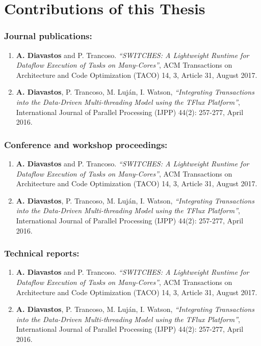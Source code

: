 \documentclass[a4paper,12pt,openright,oneside]{book}
\begin{document}
\chapter*{Contributions of this Thesis}

\singlespace
\subsection*{Journal publications:}

\begin{enumerate}
	\item \textbf{A. Diavastos} and P. Trancoso. \textit{“SWITCHES: A Lightweight Runtime for Dataflow Execution of Tasks on Many-Cores”}, ACM Transactions on Architecture and Code Optimization (TACO) 14, 3, Article 31, August 2017.

	\item \textbf{A. Diavastos}, P. Trancoso, M. Luj{\'a}n, I. Watson, \textit{“Integrating Transactions into the Data-Driven Multi-threading Model using the TFlux Platform”}, International Journal of Parallel Processing (IJPP) 44(2): 257-277, April 2016.	
\end{enumerate}


\subsection*{Conference and workshop proceedings:}

\begin{enumerate}[resume]
	\item \textbf{A. Diavastos} and P. Trancoso. \textit{“SWITCHES: A Lightweight Runtime for Dataflow Execution of Tasks on Many-Cores”}, ACM Transactions on Architecture and Code Optimization (TACO) 14, 3, Article 31, August 2017.
	
	\item \textbf{A. Diavastos}, P. Trancoso, M. Luj{\'a}n, I. Watson, \textit{“Integrating Transactions into the Data-Driven Multi-threading Model using the TFlux Platform”}, International Journal of Parallel Processing (IJPP) 44(2): 257-277, April 2016.	
\end{enumerate}


\subsection*{Technical reports:}

\begin{enumerate}[resume]
	\item \textbf{A. Diavastos} and P. Trancoso. \textit{“SWITCHES: A Lightweight Runtime for Dataflow Execution of Tasks on Many-Cores”}, ACM Transactions on Architecture and Code Optimization (TACO) 14, 3, Article 31, August 2017.
	
	\item \textbf{A. Diavastos}, P. Trancoso, M. Luj{\'a}n, I. Watson, \textit{“Integrating Transactions into the Data-Driven Multi-threading Model using the TFlux Platform”}, International Journal of Parallel Processing (IJPP) 44(2): 257-277, April 2016.	
\end{enumerate}
\end{document}
